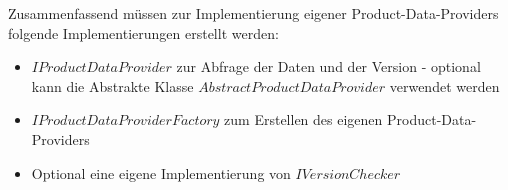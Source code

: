 \documentclass[headsepline=true, footsepline=true]{scrartcl}
\begin{document}
Zusammenfassend müssen zur Implementierung eigener Product-Data-Providers
folgende Implementierungen erstellt werden:

\begin{itemize}
	\item $IProductDataProvider$ zur Abfrage der Daten und der Version - optional
	kann die Abstrakte Klasse $AbstractProductDataProvider$ verwendet werden
	\item $IProductDataProviderFactory$ zum Erstellen des eigenen
	Product-Data-Providers
	\item Optional eine eigene Implementierung von $IVersionChecker$
\end{itemize}



\end{document}
